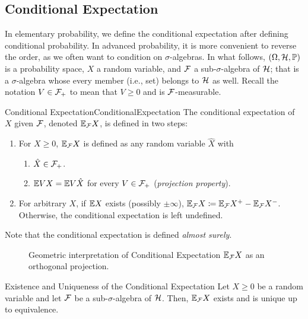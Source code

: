 \subsection{Conditional Expectation}
In elementary probability, we define the conditional expectation after defining conditional probability. In advanced probability, it is more convenient to reverse the order, as we often want to condition on $\sigma$-algebras. In what follows, $(\Omega, \mathcal{H}, \mathbb{P})$ is a probability space, $X$ a random variable, and $\mathcal{F}$ a sub-$\sigma$-algebra of $\mathcal{H}$; that is a $\sigma$-algebra whose every member (i.e., set) belongs to $\mathcal{H}$ as well. Recall the notation $V \in \mathcal{F}_+$ to mean that $V \geq 0$ and is $\mathcal{F}$-measurable.

\begin{defn}{Conditional Expectation}{ConditionalExpectation}
The conditional expectation of $X$ given $\mathcal{F}$, denoted $\mathbb{E}_{\mathcal{F}} X$, is defined in two steps:
\begin{enumerate}
    \item For $X \ge 0$, $\mathbb{E}_{\mathcal{F}} X$ is defined as any random variable $\hat{X}$ with
    \begin{enumerate}
        \item $\hat{X} \in \mathcal{F}_+$.
        \item $\mathbb{E} V X = \mathbb{E} V \hat{X}$ for every $V \in \mathcal{F}_+$ (\textit{projection property}).
    \end{enumerate}
    \item For arbitrary $X$, if $\mathbb{E} X$ exists (possibly $\pm \infty$), $\mathbb{E}_{\mathcal{F}} X \coloneqq \mathbb{E}_{\mathcal{F}} X^+ - \mathbb{E}_{\mathcal{F}} X^-$. Otherwise, the conditional expectation is left undefined.
\end{enumerate}
\end{defn}

Note that the conditional expectation is defined \textit{almost surely}.

\begin{figure}[H]
    \centering
    \label{fig:ConditionalExpectationProjection}
    
    \caption{Geometric interpretation of Conditional Expectation \(\mathbb{E}_{\mathcal{F}}X\) as an orthogonal projection.}
\end{figure}

\begin{thm}{Existence and Uniqueness of the Conditional Expectation}{}
Let $X \ge 0$ be a random variable and let $\mathcal{F}$ be a sub-$\sigma$-algebra of $\mathcal{H}$. Then, $\mathbb{E}_{\mathcal{F}} X$ exists and is unique up to equivalence.
\end{thm}

